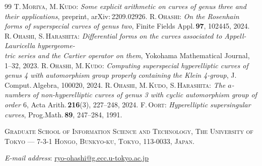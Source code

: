 \documentclass[10pt,a4paper]{amsart}
\begin{document}
\begin{thebibliography}{99}
 \textsc{T\hspace{-0.3mm}.\,Moriya, M\hspace{-0.1mm}.\,Kudo}: \textit{Some explicit arithmetic on curves of genus three and their applications}, preprint, arXiv:\,2209.02926.\vspace{-1mm}
 \textsc{R.\,Ohashi}: \textit{On the Rosenhain forms of superspecial curves of genus two}, Finite \hspace{-0.1mm}Fields \hspace{-0.2mm}Appl.\,{\bf 97}, 102445, 2024.\vspace{-1mm}
 \textsc{R.\,Ohashi, S.\,Harashita}: \textit{Differential forms on the curves associated to Appell-Lauricella hypergeome-\\tric series and the Cartier operator on them}, Yokohama Mathematical Journal\hspace{1mm}{\bf 69}, 1--32, 2023.\vspace{-1mm}
 \textsc{R.\,Ohashi, M\hspace{-0.2mm}.\,Kudo}: \textit{Computing superspecial hyperelliptic curves of genus 4 with automorphism group properly containing the Klein 4-group}, J.\,Comput.\,Algebra\hspace{1mm}{\bf 11}, 100020, 2024.\vspace{-1mm}
 \textsc{R.\,Ohashi, M\hspace{-0.2mm}.\,Kudo, S.\,Harashita}: \textit{The $a$-numbers of non-hyperelliptic curves of genus 3 with cyclic automorphism group of order $6$}, Acta Arith.\,{\bf 216}(3), 227--248, 2024.\vspace{-1mm}
 \textsc{F\hspace{-0.2mm}.\,Oort}: \textit{Hyperelliptic supersingular curves}, Prog.\hspace{0.8mm}Math.\,{\bf 89}, 247--284, 1991.\vspace{-1mm}
\end{thebibliography}\vspace{2.3mm}

\textsc{Graduate School of Information Science and Technology, The
University of Tokyo — 7-3-1 Hongo, Bunkyo-ku, Tokyo, 113-0033, Japan.}\par
\textit{E-mail address}: \url{ryo-ohashi@g.ecc.u-tokyo.ac.jp}
\end{document}
